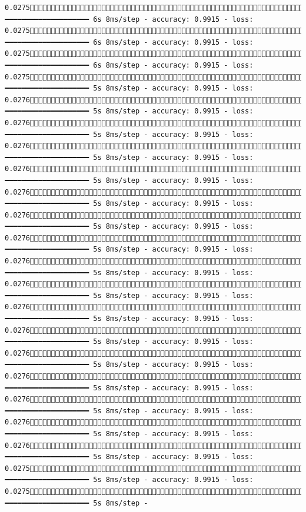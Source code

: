 \documentclass[
  letterpaper,
  DIV=11,
  numbers=noendperiod]{scrreprt}
\begin{document}
\begin{verbatim}
0.02751072/1875 ━━━━━━━━━━━━━━━━━━━━ 6s 8ms/step - accuracy: 0.9915 - loss: 0.02751079/1875 ━━━━━━━━━━━━━━━━━━━━ 6s 8ms/step - accuracy: 0.9915 - loss: 0.02751086/1875 ━━━━━━━━━━━━━━━━━━━━ 6s 8ms/step - accuracy: 0.9915 - loss: 0.02751093/1875 ━━━━━━━━━━━━━━━━━━━━ 5s 8ms/step - accuracy: 0.9915 - loss: 0.02761100/1875 ━━━━━━━━━━━━━━━━━━━━ 5s 8ms/step - accuracy: 0.9915 - loss: 0.02761107/1875 ━━━━━━━━━━━━━━━━━━━━ 5s 8ms/step - accuracy: 0.9915 - loss: 0.02761114/1875 ━━━━━━━━━━━━━━━━━━━━ 5s 8ms/step - accuracy: 0.9915 - loss: 0.02761120/1875 ━━━━━━━━━━━━━━━━━━━━ 5s 8ms/step - accuracy: 0.9915 - loss: 0.02761126/1875 ━━━━━━━━━━━━━━━━━━━━ 5s 8ms/step - accuracy: 0.9915 - loss: 0.02761133/1875 ━━━━━━━━━━━━━━━━━━━━ 5s 8ms/step - accuracy: 0.9915 - loss: 0.02761140/1875 ━━━━━━━━━━━━━━━━━━━━ 5s 8ms/step - accuracy: 0.9915 - loss: 0.02761147/1875 ━━━━━━━━━━━━━━━━━━━━ 5s 8ms/step - accuracy: 0.9915 - loss: 0.02761154/1875 ━━━━━━━━━━━━━━━━━━━━ 5s 8ms/step - accuracy: 0.9915 - loss: 0.02761160/1875 ━━━━━━━━━━━━━━━━━━━━ 5s 8ms/step - accuracy: 0.9915 - loss: 0.02761166/1875 ━━━━━━━━━━━━━━━━━━━━ 5s 8ms/step - accuracy: 0.9915 - loss: 0.02761170/1875 ━━━━━━━━━━━━━━━━━━━━ 5s 8ms/step - accuracy: 0.9915 - loss: 0.02761175/1875 ━━━━━━━━━━━━━━━━━━━━ 5s 8ms/step - accuracy: 0.9915 - loss: 0.02761182/1875 ━━━━━━━━━━━━━━━━━━━━ 5s 8ms/step - accuracy: 0.9915 - loss: 0.02761187/1875 ━━━━━━━━━━━━━━━━━━━━ 5s 8ms/step - accuracy: 0.9915 - loss: 0.02761193/1875 ━━━━━━━━━━━━━━━━━━━━ 5s 8ms/step - accuracy: 0.9915 - loss: 0.02751199/1875 ━━━━━━━━━━━━━━━━━━━━ 5s 8ms/step - accuracy: 0.9915 - loss: 0.02751204/1875 ━━━━━━━━━━━━━━━━━━━━ 5s 8ms/step - 
\end{verbatim}
\end{document}
